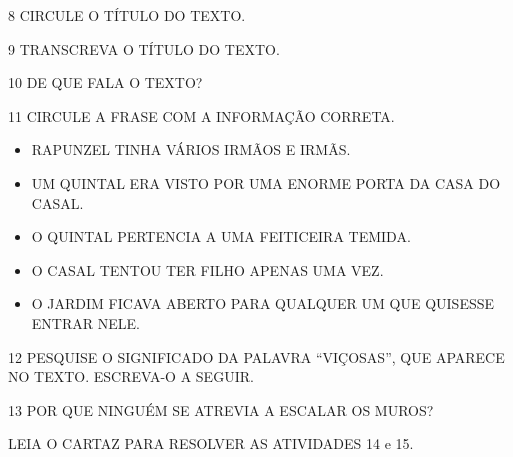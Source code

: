 \num{8} CIRCULE O TÍTULO DO TEXTO. 

\vspace{0.5cm}

\num{9} TRANSCREVA O TÍTULO DO TEXTO.


\num{10} DE QUE FALA O TEXTO?


\num{11} CIRCULE A FRASE COM A INFORMAÇÃO CORRETA.

\begin{itemize}[itemsep=8pt]
	\item RAPUNZEL TINHA VÁRIOS IRMÃOS E IRMÃS.

	\item UM QUINTAL ERA VISTO POR UMA ENORME PORTA DA CASA DO CASAL.

	\item O QUINTAL PERTENCIA A UMA FEITICEIRA TEMIDA. 

	\item O CASAL TENTOU TER FILHO APENAS UMA VEZ.

	\item O JARDIM FICAVA ABERTO PARA QUALQUER UM QUE QUISESSE ENTRAR NELE.
\end{itemize}

\num{12} PESQUISE O SIGNIFICADO DA PALAVRA ``VIÇOSAS'', QUE APARECE NO TEXTO. ESCREVA-O A SEGUIR.


\num{13} POR QUE NINGUÉM SE ATREVIA A ESCALAR OS MUROS?


LEIA O CARTAZ PARA RESOLVER AS ATIVIDADES 14 e 15.


